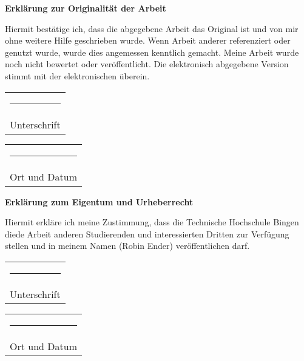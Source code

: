 \leavevmode
\vfill

\begin{center}
\textbf{Erklärung zur Originalität der Arbeit}
\end{center}
Hiermit bestätige ich, dass die abgegebene Arbeit das Original ist und von mir ohne weitere Hilfe geschrieben wurde. Wenn Arbeit anderer referenziert oder genutzt wurde, wurde dies angemessen kenntlich gemacht. Meine Arbeit wurde noch nicht bewertet oder veröffentlicht. Die elektronisch abgegebene Version stimmt mit der elektronischen überein.

\vspace{1cm}
\hfill
\begin{tabular}[t]{c}
  \rule{10em}{0.4pt}\\ Unterschrift
\end{tabular}
\hfill
\begin{tabular}[t]{c}
  \rule{10em}{0.4pt}\\ Ort und Datum
\end{tabular}
\hfill
\strut
\vspace{2cm}


\begin{center}
\textbf{Erklärung zum Eigentum und Urheberrecht}
\end{center}
Hiermit erkläre ich meine Zustimmung, dass die Technische Hochschule Bingen diede Arbeit anderen Studierenden und interessierten Dritten zur Verfügung stellen und in meinem Namen (Robin Ender) veröffentlichen darf.

\vspace{1cm}
\hfill
\begin{tabular}[t]{c}
  \rule{10em}{0.4pt}\\ Unterschrift
\end{tabular}
\hfill
\begin{tabular}[t]{c}
  \rule{10em}{0.4pt}\\ Ort und Datum
\end{tabular}
\hfill
\strut
\vfill


